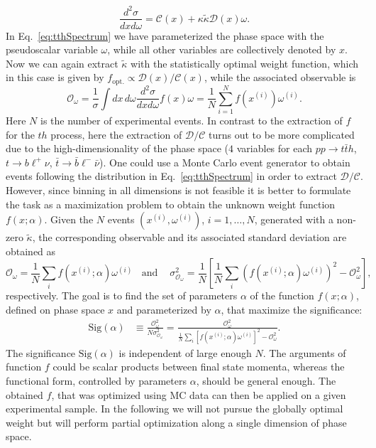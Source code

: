\documentclass[11pt,a4paper]{article}
\newcommand{\mc}[1]{\mathcal{#1}}
\newcommand{\mrm}[1]{\mathrm{#1}}
\begin{document}
\begin{equation}
\label{eq:tthSpectrum}
\frac{d^2\sigma}{d x d \omega} = \mc{C}(x) + \kappa \tilde{\kappa} \mc{D}(x) \omega .
\end{equation}
In Eq.~\eqref{eq:tthSpectrum} we have parameterized the phase space
with the pseudoscalar variable $\omega$, while all other variables are collectively 
denoted by $x$. Now we can again extract
$\tilde \kappa$ with the statistically optimal weight function, which in this
case is given by $f_\mrm{opt.} \propto  \mc{D}(x) /\mc{C}(x)$, while the associated
observable is 
\begin{equation}
  \label{eq:Oomega}
\mc{O}_\omega = \frac{1}{\sigma} \int dx\,d\omega \frac{d^2\sigma}{dx
  d\omega} f(x) \omega  = \frac{1}{N}\sum_{i=1}^N f(x^{(i)}) \omega^{(i)}.
\end{equation}
Here $N$ is the number of experimental events. In contrast to the extraction of $f$ for the $th$
process, here the extraction of $\mc{D}/\mc{C}$ turns out to
be more complicated due to the high-dimensionality of the phase space ($4$
variables for each $p p \to t \bar t h$, $t \to b \ell^+ \nu$,
$\bar t \to \bar b \ell^- \bar \nu$). One could use a Monte Carlo event generator to obtain events following the distribution in Eq.~\eqref{eq:tthSpectrum} in order to extract $\mc{D}/\mc{C}$. However, since binning in all
dimensions is not feasible it is better to formulate the task as a maximization problem to obtain the unknown weight function $f(x;\alpha)$. Given the $N$ events $(x^{(i)}, \omega^{(i)})$, $i=1,\ldots, N$, generated with a
non-zero $\tilde \kappa$, the corresponding observable and its associated standard
deviation are obtained as
\begin{equation}
\mc{O}_\omega = \frac{1}{N} \sum_i f(x^{(i)};\alpha) \omega^{(i)}\ \ \ \ \text{and }\ \ \ \
\sigma_{\mc{O}_\omega}^2 = \frac{1}{N} \left[\frac{1}{N}\sum_i(f(x^{(i)};\alpha) \omega^{(i)})^2 - \mc{O}_\omega^2\right],
\end{equation} 
respectively. The goal is to find the set of parameters $\alpha$ of
the function $f(x; \alpha)$, defined on phase space $x$ and
parameterized by $\alpha$, that maximize the significance:
\begin{equation}
  \label{eq:tthOptimization}
  \begin{split}
    \mrm{Sig}(\alpha) &\equiv \frac{\mc{O}^2_\omega}{N \sigma^2_{\mc{O}_\omega}}= \frac{\mc{O}_\omega^2}{\frac{1}{N} \sum_i  \left[f(x^{(i)};\alpha) \omega^{(i)}\right]^2 - \mc{O}_\omega^2}.
  \end{split}
\end{equation}
The significance $\mrm{Sig}(\alpha)$ is independent of large enough
$N$.  The arguments of function $f$ could be scalar products between
final state momenta, whereas the functional form, controlled by
parameters $\alpha$, should be general enough.  The obtained $f$, that
was optimized using MC data can then be applied on a given
experimental sample. In the following we will not pursue the globally optimal
weight but will perform partial optimization along a single
dimension of phase space.\\
\end{document}

